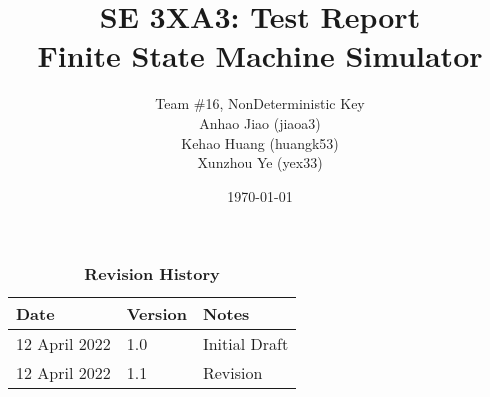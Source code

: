 \documentclass[12pt, titlepage]{article}
\title{SE 3XA3: Test Report\\Finite State Machine Simulator}
\author{
  Team \#16, NonDeterministic Key \\
  Anhao Jiao (jiaoa3) \\
  Kehao Huang (huangk53) \\
  Xunzhou Ye (yex33)
}
\date{\today}
\begin{document}
\maketitle

\tableofcontents
\listoftables
\listoffigures

\begin{table}[bp]
\caption{\bf Revision History}
\begin{tabularx}{\textwidth}{p{3cm}p{2cm}X}
\toprule {\bf Date} & {\bf Version} & {\bf Notes}\\
\midrule
12 April 2022 & 1.0 & Initial Draft\\
12 April 2022 & 1.1 & Revision\\
\bottomrule
\end{tabularx}
\end{table}

\newpage

\end{document}
